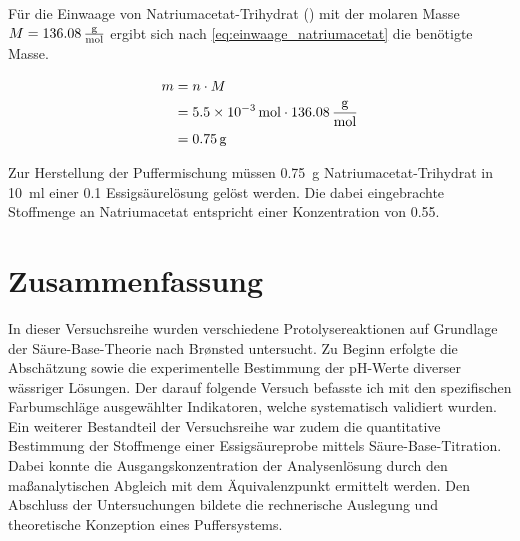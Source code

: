Für die Einwaage von Natriumacetat-Trihydrat () mit der molaren Masse $M = \SI{136,08}{\frac{\gram}{\mole}}$ ergibt sich nach \eqref{eq:einwaage_natriumacetat} die benötigte Masse.

\begin{equation}
    \label{eq:einwaage_natriumacetat}
    \begin{aligned}
        m
         & = n \cdot M                                                 \\
         & = \SI{5,5e-3}{\mole} \cdot \SI{136,08}{\frac{\gram}{\mole}} \\
         & = \SI{0,75}{\gram}
    \end{aligned}
\end{equation}

Zur Herstellung der Puffermischung müssen \SI{0,75}{\gram} Natriumacetat-Trihydrat in \SI{10}{\milli l} einer \SI{0,1}{} Essigsäurelösung gelöst werden. Die dabei eingebrachte Stoffmenge an Natriumacetat entspricht einer Konzentration von \SI{0,55}{}.
\newpage


\section{Zusammenfassung}

In dieser Versuchsreihe wurden verschiedene Protolysereaktionen auf Grundlage der Säure-Base-Theorie nach Brønsted untersucht. Zu Beginn erfolgte die Abschätzung sowie die experimentelle Bestimmung der pH-Werte diverser wässriger Lösungen. Der darauf folgende Versuch befasste ich mit den spezifischen Farbumschläge ausgewählter Indikatoren, welche systematisch validiert wurden. Ein weiterer Bestandteil der Versuchsreihe war zudem die quantitative Bestimmung der Stoffmenge einer Essigsäureprobe mittels Säure-Base-Titration. Dabei konnte die Ausgangskonzentration der Analysenlösung durch den maßanalytischen Abgleich mit dem Äquivalenzpunkt ermittelt werden. Den Abschluss der Untersuchungen bildete die rechnerische Auslegung und theoretische Konzeption eines Puffersystems.